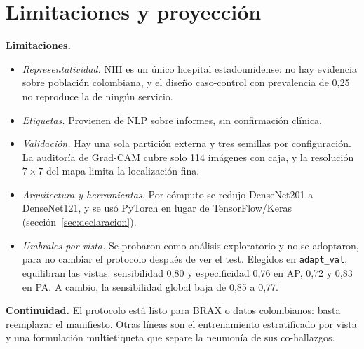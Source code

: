\documentclass[11pt]{article}
\begin{document}
\begin{table}[h]\centering\small
\caption{Costo de entrenamiento e inferencia (medias de tres semillas, GPU GTX 1650). La latencia es la mediana de 100 inferencias de una imagen, con IQR.}\label{tab:costo}

\end{table}

\section{Limitaciones y proyección}\label{sec:limites}
\textbf{Limitaciones.}
\begin{itemize}
\item \emph{Representatividad.} NIH es un único hospital estadounidense: no hay evidencia sobre población colombiana, y el diseño caso-control con prevalencia de 0,25 no reproduce la de ningún servicio.
\item \emph{Etiquetas.} Provienen de NLP sobre informes, sin confirmación clínica.
\item \emph{Validación.} Hay una sola partición externa y tres semillas por configuración. La auditoría de Grad-CAM cubre solo 114 imágenes con caja, y la resolución $7\times7$ del mapa limita la localización fina.
\item \emph{Arquitectura y herramientas.} Por cómputo se redujo DenseNet201 a DenseNet121, y se usó PyTorch en lugar de TensorFlow/Keras (sección~\ref{sec:declaracion}).
\item \emph{Umbrales por vista.} Se probaron como análisis exploratorio y no se adoptaron, para no cambiar el protocolo después de ver el test. Elegidos en \texttt{adapt\_val}, equilibran las vistas: sensibilidad 0,80 y especificidad 0,76 en AP, 0,72 y 0,83 en PA. A cambio, la sensibilidad global baja de 0,85 a 0,77.
\end{itemize}

\textbf{Continuidad.} El protocolo está listo para BRAX o datos colombianos: basta reemplazar el manifiesto. Otras líneas son el entrenamiento estratificado por vista y una formulación multietiqueta que separe la neumonía de sus co-hallazgos.
\end{document}
